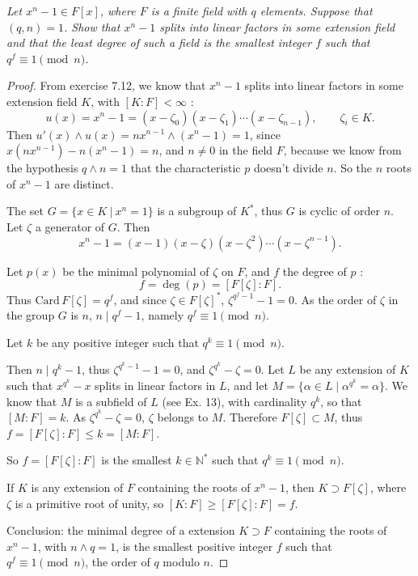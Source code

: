 \documentclass[11pt,a4paper]{article}
\newcommand{\N}{\mathbb{N}}
\begin{document}
{\it Let $x^n-1 \in F[x]$, where $F$ is a finite field with $q$ elements. Suppose that $(q,n) = 1$. Show that $x^n-1$ splits into linear factors in some extension field and that the least degree of such a field is the smallest integer $f$ such that $q^f \equiv 1 \pmod n$.

}

\begin{proof}
From exercise 7.12, we know that $x^n-1$ splits into linear factors in some extension field $K$, with $[K:F]<\infty$ :
$$u(x)= x^n-1 = (x-\zeta_0)(x-\zeta_1)\cdots(x-\zeta_{n-1}), \qquad \zeta_i \in K.$$
Then $u'(x)\wedge u(x) = nx^{n-1} \wedge (x^n-1) = 1$, since $x(nx^{n-1}) - n(x^n-1) = n$, and $n\neq 0$ in the field $F$, because we know from the hypothesis $q \wedge n=1$ that the characteristic $p$ doesn't divide $n$. So the $n$ roots of $x^n-1$ are distinct.

The set $G = \{x \in K \ \vert \ x^n=1\}$ is a subgroup of $K^*$, thus $G$ is cyclic of order $n$. Let $\zeta$ a generator of $G$. Then
$$x^n-1 = (x-1)(x-\zeta)(x-\zeta^2)\cdots(x-\zeta^{n-1}).$$

Let $p(x)$ be the minimal polynomial of $\zeta$ on $F$, and $f$ the degree of $p$ :
$$f = \deg(p) = [F[\zeta] : F].$$
Thus $\mathrm{Card}\, F[\zeta] = q^f$, and since $\zeta \in F[\zeta]^*$, $\zeta^{q^f - 1} -1 = 0$.
As the order of $\zeta$ in the group $G$ is $n$, $n \mid q^f - 1$, namely $q^f \equiv 1 \pmod n$.

\bigskip

Let $k$ be any positive integer such that $q^k \equiv 1 \pmod n$.

Then $n \mid q^k - 1$, thus $\zeta^{q^k-1} - 1 = 0$, and  $\zeta^{q^k} - \zeta = 0$. Let $L$ be any extension of $K$ such that $x^{q^k} - x$ splits in linear factors in $L$, and let $M=\{\alpha \in L \mid \alpha^{q^k} = \alpha\}$. We know that $M$ is a subfield of $L$ (see Ex. 13), with cardinality $q^k$, so that $[M:F]= k$. As $\zeta^{q^k} - \zeta = 0$, $\zeta $ belongs to $M$. Therefore $F[\zeta] \subset M$, thus $f = [F[\zeta] : F] \leq k = [M:F]$.

So $f = [F[\zeta] : F]$ is the smallest $k \in \N^*$ such that $q^k\equiv 1 \pmod n$.

If $K$ is any extension of $F$ containing the roots of $x^n-1$, then $K \supset F[\zeta]$, where $\zeta$ is a primitive root of unity, so $[K : F] \geq [F[\zeta]:F] = f$.

Conclusion: the minimal degree of a extension $K \supset F$ containing the roots of $x^n - 1$, with $n\wedge q = 1$, is the smallest positive integer $f$ such that $q^f \equiv 1 \pmod n$, the order of $q$ modulo $n$.
\end{proof}
\end{document}
